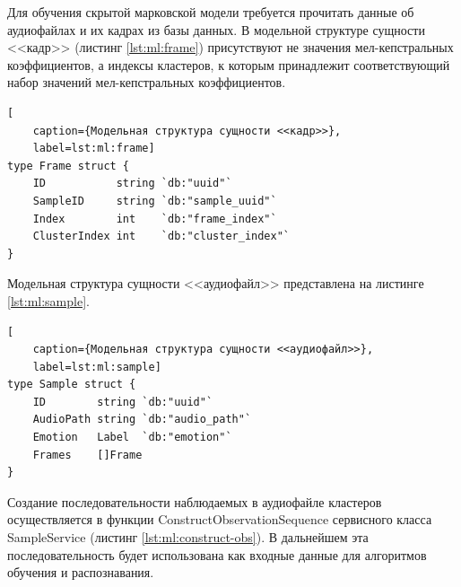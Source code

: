 Для обучения скрытой марковской модели требуется прочитать данные об аудиофайлах и их кадрах из базы данных. В модельной структуре сущности <<кадр>> (листинг \ref{lst:ml:frame}) присутствуют не значения мел-кепстральных коэффициентов, а индексы кластеров, к которым принадлежит соответствующий набор значений мел-кепстральных коэффициентов. 
\begin{lstlisting}[
	caption={Модельная структура сущности <<кадр>>},
	label=lst:ml:frame]
type Frame struct {
	ID           string `db:"uuid"`
	SampleID     string `db:"sample_uuid"`
	Index        int    `db:"frame_index"`
	ClusterIndex int    `db:"cluster_index"`
}
\end{lstlisting}
Модельная структура сущности <<аудиофайл>> представлена на листинге \ref{lst:ml:sample}. 
\begin{lstlisting}[
	caption={Модельная структура сущности <<аудиофайл>>},
	label=lst:ml:sample]
type Sample struct {
	ID        string `db:"uuid"`
	AudioPath string `db:"audio_path"`
	Emotion   Label  `db:"emotion"`
	Frames    []Frame
}
\end{lstlisting}

Создание последовательности наблюдаемых в аудиофайле кластеров осуществляется в функции ConstructObservationSequence сервисного класса SampleService (листинг \ref{lst:ml:construct-obs}). В дальнейшем эта последовательность будет использована как входные данные для алгоритмов обучения и распознавания.

